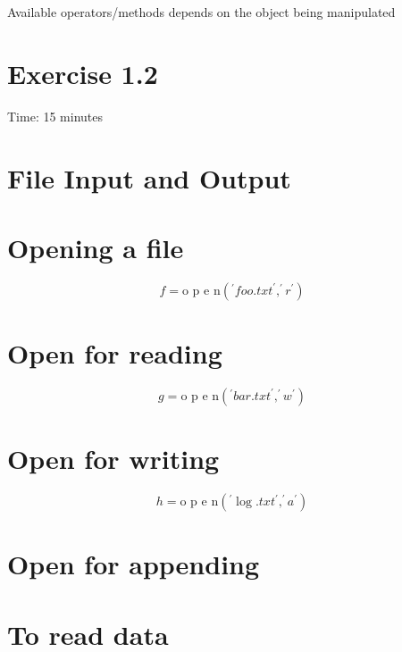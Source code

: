 \documentclass[
  letterpaper,
  DIV=11,
  numbers=noendperiod]{scrreprt}
\begin{document}
Available operators/methods depends on the object being manipulated


\chapter{Exercise 1.2}\label{exercise-1.2}

Time: 15 minutes


\chapter{File Input and Output}\label{file-input-and-output}


\chapter{Opening a file}\label{opening-a-file}

\[
f = \text {o p e n} \left(^ {\prime} f o o. t x t ^ {\prime}, ^ {\prime} r ^ {\prime}\right)
\]


\chapter{Open for reading}\label{open-for-reading}

\[
g = \text {o p e n} \left(^ {\prime} b a r. t x t ^ {\prime}, ^ {\prime} w ^ {\prime}\right)
\]


\chapter{Open for writing}\label{open-for-writing}

\[
h = \text {o p e n} \left(^ {\prime} \log . t x t ^ {\prime}, ^ {\prime} a ^ {\prime}\right)
\]


\chapter{Open for appending}\label{open-for-appending}


\chapter{To read data}\label{to-read-data}
\end{document}
